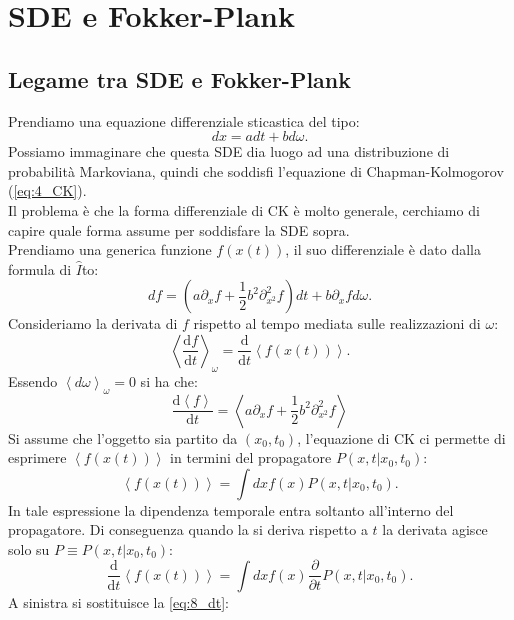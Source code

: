 \section{SDE e Fokker-Plank}%
\label{sub:Lezione 8}
\mylocaltoc
\subsection{Legame tra SDE e Fokker-Plank}%
\label{sub:Legame tra SDE e Fokker-Plank}
Prendiamo una equazione differenziale sticastica del tipo:
\[
    dx = adt + bd\omega
.\] 
Possiamo immaginare che questa SDE dia luogo ad una distribuzione di probabilità Markoviana, quindi che soddisfi l'equazione di Chapman-Kolmogorov (\ref{eq:4_CK}). \\
Il problema è che la forma differenziale di CK è molto generale, cerchiamo di capire quale forma assume per soddisfare la SDE sopra.\\
Prendiamo una generica funzione $f(x(t))$, il suo differenziale è dato dalla formula di $\hat{I}$to:
\[
    df = \left(a\partial_{x}f + \frac{1}{2}b^2\partial^2_{x^2}f\right)dt + b \partial_{x}f d\omega
.\] 
Consideriamo la derivata di $f$ rispetto al tempo mediata sulle realizzazioni di $\omega$:
\[
    \left<\frac{\text{d} f}{\text{d} t} \right>_{\omega} = \frac{\text{d} }{\text{d} t} \left<f(x(t) )\right>
.\] 
Essendo $\left<d\omega\right>_{\omega}=0$ si ha che:
\begin{equation}
    \frac{\text{d} \left<f\right>}{\text{d} t} = \left<a \partial_{x}f +\frac{1}{2}b^2\partial^2_{x^2}f\right>
    \label{eq:8_dt}
\end{equation}
Si assume che l'oggetto sia partito da $\left(x_0, t_0\right)$, l'equazione di CK ci permette di esprimere $\left<f(x(t))\right>$ in termini del propagatore $P\left(x,t|x_0, t_0\right)$:
\[
    \left<f(x(t) ) \right> =  \int  dx f(x) P\left(x,t|x_0, t_0\right)
.\] 
In tale espressione la dipendenza temporale entra soltanto all'interno del propagatore. Di conseguenza quando la si deriva rispetto a $t$ la derivata agisce solo su $P \equiv P(x,t|x_0,t_0)$:
\[
   \frac{\text{d} }{\text{d} t} \left<f(x(t) ) \right> =  \int  dx f(x) \frac{\partial }{\partial t}  P\left(x,t|x_0, t_0\right)
.\] 
A sinistra si sostituisce la \ref{eq:8_dt}:

